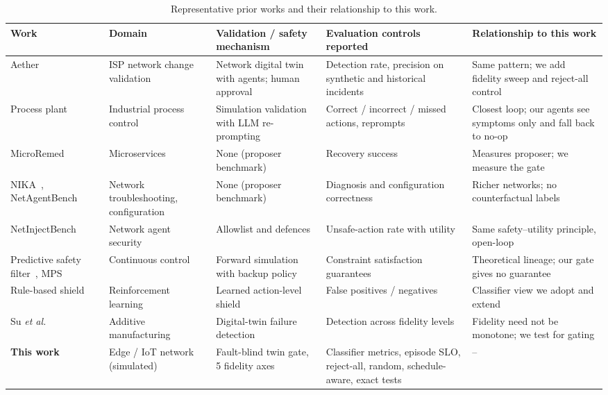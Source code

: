 \documentclass[conference]{IEEEtran}
\begin{document}
\begin{table}[t]
\centering
\caption{Representative prior works and their relationship to this work.}
\label{tab:related}
\small
\begin{tabularx}{\textwidth}{@{}p{2.6cm}p{2.5cm}YYY@{}}
\toprule
Work & Domain & Validation / safety mechanism & Evaluation controls reported & Relationship to this work \\
\midrule
Aether~\cite{aether} & ISP network change validation & Network digital twin with agents; human approval & Detection rate, precision on synthetic and historical incidents & Same pattern; we add fidelity sweep and reject-all control \\
Process plant~\cite{processplant} & Industrial process control & Simulation validation with LLM re-prompting & Correct / incorrect / missed actions, reprompts & Closest loop; our agents see symptoms only and fall back to no-op \\
MicroRemed~\cite{microremed} & Microservices & None (proposer benchmark) & Recovery success & Measures proposer; we measure the gate \\
NIKA~\cite{nika}, NetAgentBench~\cite{netagentbench} & Network troubleshooting, configuration & None (proposer benchmark) & Diagnosis and configuration correctness & Richer networks; no counterfactual labels \\
NetInjectBench~\cite{netinjectbench} & Network agent security & Allowlist and defences & Unsafe-action rate with utility & Same safety--utility principle, open-loop \\
Predictive safety filter~\cite{wabersich}, MPS~\cite{mps} & Continuous control & Forward simulation with backup policy & Constraint satisfaction guarantees & Theoretical lineage; our gate gives no guarantee \\
Rule-based shield~\cite{rulebasedshield} & Reinforcement learning & Learned action-level shield & False positives / negatives & Classifier view we adopt and extend \\
Su \emph{et al.}~\cite{fidelityam} & Additive manufacturing & Digital-twin failure detection & Detection across fidelity levels & Fidelity need not be monotone; we test for gating \\
\textbf{This work} & Edge / IoT network (simulated) & Fault-blind twin gate, 5 fidelity axes & Classifier metrics, episode SLO, reject-all, random, schedule-aware, exact tests & -- \\
\bottomrule
\end{tabularx}
\end{table}
\end{document}
